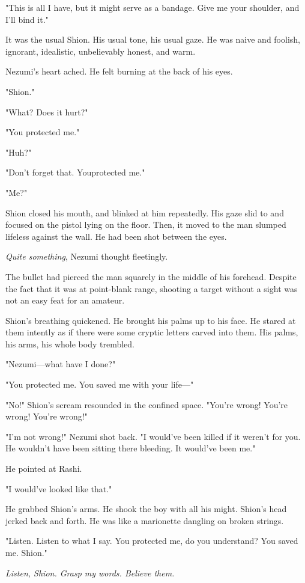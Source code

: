 "This is all I have, but it might serve as a bandage. Give me your
shoulder, and I'll bind it."

It was the usual Shion. His usual tone, his usual gaze. He was naive and
foolish, ignorant, idealistic, unbelievably honest, and warm.

Nezumi's heart ached. He felt burning at the back of his eyes.

"Shion."

"What? Does it hurt?"

"You protected me."

"Huh?"

"Don't forget that. You\el protected me."

"Me?"

Shion closed his mouth, and blinked at him repeatedly. His gaze slid to
and focused on the pistol lying on the floor. Then, it moved to the man
slumped lifeless against the wall. He had been shot between the eyes.

\emph{Quite something}, Nezumi thought fleetingly.

The bullet had pierced the man squarely in the middle of his forehead.
Despite the fact that it was at point-blank range, shooting a target
without a sight was not an easy feat for an amateur.

Shion's breathing quickened. He brought his palms up to his face. He
stared at them intently as if there were some cryptic letters carved
into them. His palms, his arms, his whole body trembled.

"Nezumi---what have I done?"

"You protected me. You saved me with your life---"

"No!" Shion's scream resounded in the confined space. "You're wrong!
You're wrong! You're wrong!"

"I'm not wrong!" Nezumi shot back. "I would've been killed if it weren't
for you. He wouldn't have been sitting there bleeding. It would've been
me."

He pointed at Rashi.

"I would've looked like that."

He grabbed Shion's arms. He shook the boy with all his might. Shion's
head jerked back and forth. He was like a marionette dangling on broken
strings.

"Listen. Listen to what I say. You protected me, do you understand? You
saved me. Shion."

\emph{Listen, Shion. Grasp my words. Believe them.}

